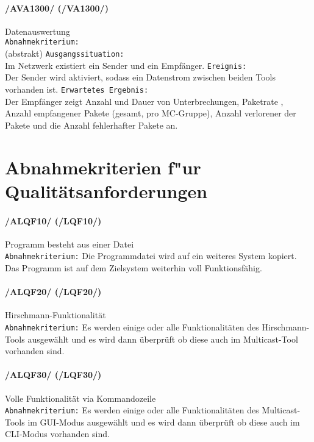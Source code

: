 \paragraph{/AVA1300/ (/VA1300/)} Datenauswertung\\%
\texttt{Abnahmekriterium:} \\(abstrakt)
\texttt{Ausgangssituation:} \\Im Netzwerk existiert ein Sender und ein
Empfänger. 
\texttt{Ereignis:} \\Der Sender wird aktiviert, sodass ein Datenstrom zwischen
beiden Tools vorhanden ist. 
\texttt{Erwartetes Ergebnis:} \\Der Empfänger zeigt Anzahl und Dauer von Unterbrechungen, Paketrate , Anzahl empfangener Pakete (gesamt, pro MC-Gruppe), Anzahl verlorener
der Pakete und die Anzahl fehlerhafter Pakete an.

\section{Abnahmekriterien f"ur Qualitätsanforderungen}

\paragraph{/ALQF10/ (/LQF10/)} Programm besteht aus einer Datei\\ 
\texttt{Abnahmekriterium:} Die Programmdatei wird auf ein
weiteres System kopiert. Das Programm ist auf dem
Zielsystem weiterhin voll Funktionsfähig.\\

\paragraph{/ALQF20/ (/LQF20/)} Hirschmann-Funktionalität\\ 
\texttt{Abnahmekriterium:} Es werden einige oder alle Funktionalitäten des
Hirschmann-Tools ausgewählt und es wird dann überprüft ob diese auch im
Multicast-Tool vorhanden sind. \\

\paragraph{/ALQF30/ (/LQF30/)} Volle Funktionalität via Kommandozeile\\
\texttt{Abnahmekriterium:} Es werden einige oder alle Funktionalitäten des
Multicast-Tools im GUI-Modus ausgewählt und es wird dann überprüft ob diese auch
im CLI-Modus vorhanden sind.\\

